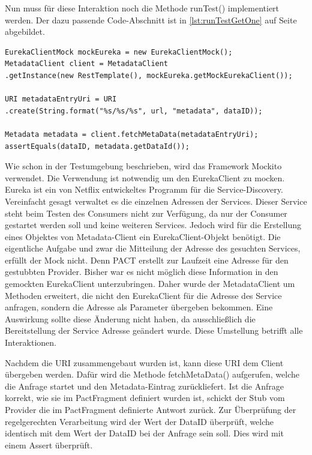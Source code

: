 \documentclass{llncs}
\begin{document}
Nun muss für diese Interaktion noch die Methode runTest() implementiert werden. Der dazu passende Code-Abschnitt ist in \ref{lst:runTestGetOne} auf Seite \pageref{lst:runTestGetOne} abgebildet.

\lstset{language = Java}
\begin{lstlisting}[caption=runTest() für die GET-Methode,label={lst:runTestGetOne}]
EurekaClientMock mockEureka = new EurekaClientMock();
MetadataClient client = MetadataClient
.getInstance(new RestTemplate(), mockEureka.getMockEurekaClient());

URI metadataEntryUri = URI
.create(String.format("%s/%s/%s", url, "metadata", dataID));

Metadata metadata = client.fetchMetaData(metadataEntryUri);
assertEquals(dataID, metadata.getDataId());
\end{lstlisting}
 
Wie schon in der Testumgebung beschrieben, wird das Framework Mockito verwendet. Die Verwendung ist notwendig um den EurekaClient zu mocken. Eureka \cite{Ranganathan2012} ist ein von Netflix entwickeltes Programm für die Service-Discovery. Vereinfacht gesagt verwaltet es die einzelnen Adressen der Services. Dieser Service steht beim Testen des Consumers nicht zur Verfügung, da nur der Consumer gestartet werden soll und keine weiteren Services. Jedoch wird für die Erstellung eines Objektes von Metadata-Client ein EurekaClient-Objekt benötigt. Die eigentliche Aufgabe und zwar die Mitteilung der Adresse des gesuchten Services, erfüllt der Mock nicht. Denn PACT erstellt zur Laufzeit eine Adresse für den gestubbten Provider. Bisher war es nicht möglich diese Information in den gemockten EurekaClient unterzubringen. Daher wurde der MetadataClient um Methoden erweitert, die nicht den EurekaClient für die Adresse des Service anfragen, sondern die Adresse als Parameter übergeben bekommen. Eine Auswirkung sollte diese Änderung nicht haben, da ausschließlich die Bereitstellung der Service Adresse geändert wurde. Diese Umstellung betrifft alle Interaktionen.

Nachdem die URI zusammengebaut wurden ist, kann diese URI dem Client übergeben werden. Dafür wird die Methode fetchMetaData() aufgerufen, welche die Anfrage startet und den Metadata-Eintrag zurückliefert. Ist die Anfrage korrekt, wie sie im PactFragment definiert wurden ist, schickt der Stub vom Provider die im PactFragment definierte Antwort zurück. Zur Überprüfung der regelgerechten Verarbeitung wird der Wert der DataID überprüft, welche identisch mit dem Wert der DataID bei der Anfrage sein soll. Dies wird mit einem Assert überprüft.
\end{document}
